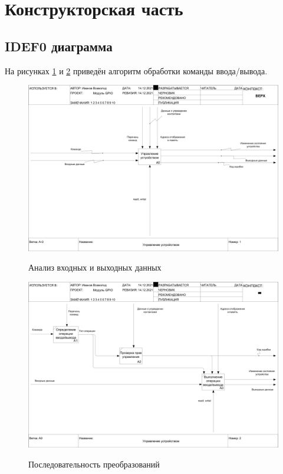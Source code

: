 \section{Конструкторская часть}

\subsection{IDEF0 диаграмма}
На рисунках \ref{alg:idef0:0} и \ref{alg:idef0:1} приведён алгоритм обработки команды ввода/вывода.

\begin{figure}[h!] 
	\begin{center}
		{\includegraphics[scale=0.3, angle=0]{img/01_A-0.png}}
		\caption{Анализ входных и выходных данных}
		\label{alg:idef0:0}
	\end{center}
\end{figure}

\begin{figure}[h!] 
	\begin{center}
		{\includegraphics[scale=0.3, angle=0]{img/02_A0.png}}
		\caption{Последовательность преобразований}
		\label{alg:idef0:1}
	\end{center}
\end{figure}
\pagebreak

